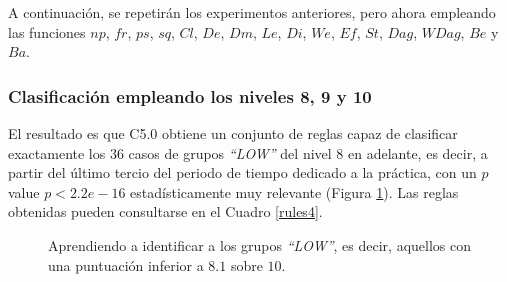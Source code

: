 A continuación, se repetirán los experimentos anteriores, pero ahora empleando las funciones $np$, $fr$, $ps$, $sq$, $Cl$, $De$, $Dm$, $Le$, $Di$, $We$, $Ef$, $St$, $Dag$, $WDag$, $Be$ y $Ba$.

\subsubsection{Clasificación empleando los niveles 8, 9 y 10}

El resultado es que C5.0 obtiene un conjunto de reglas capaz de clasificar exactamente los $36$ casos de grupos \emph{``LOW''} del nivel $8$ en adelante, es decir, a partir del último tercio del periodo de tiempo dedicado a la práctica, con un $p$ value $p < 2.2e-16$ estadísticamente muy relevante (Figura \ref{fig:cm4}). Las reglas obtenidas pueden consultarse en el Cuadro \ref{rules4}.

\begin{figure}[H]
\centering
{}
\caption{Aprendiendo a identificar a los grupos \emph{``LOW''}, es decir, aquellos con una puntuación inferior a $8.1$ sobre $10$.}
\label{fig:cm4}
\end{figure}

